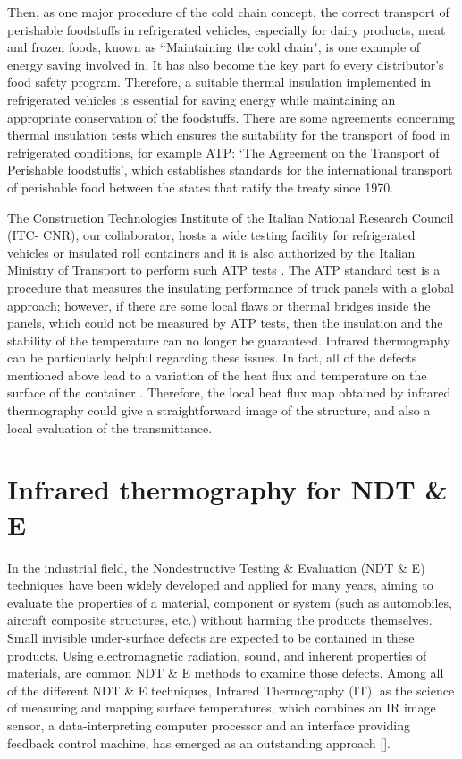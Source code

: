 Then, as one major procedure of the cold chain concept, the correct transport of perishable foodstuffs in refrigerated vehicles, especially for dairy products, meat and frozen foods, known as ``Maintaining the cold chain", is one example of energy saving involved in. It has also become the key part fo every distributor's food safety program. Therefore, a suitable thermal insulation implemented in refrigerated vehicles is essential for saving energy while maintaining an appropriate conservation of the foodstuffs. There are some agreements concerning thermal insulation tests which ensures the suitability for the transport of food in refrigerated conditions, for example ATP: ‘The Agreement on the Transport of Perishable foodstuffs’\citep{Geneva1970}, which establishes standards for the international transport of perishable food between the states that ratify the treaty since 1970.

The Construction Technologies Institute of the Italian National Research Council (ITC- CNR), our collaborator, hosts a wide testing facility for refrigerated vehicles or insulated roll containers and it is also authorized by the Italian Ministry of Transport to perform such ATP tests \citep{Tassou2009,dragano2009experimental}. The ATP standard test is a procedure that measures the insulating performance of truck panels with a global approach; however, if there are some local flaws or thermal bridges inside the panels, which could not be measured by ATP tests, then the insulation and the stability of the temperature can no longer be guaranteed. Infrared thermography can be particularly helpful regarding these issues. In fact, all of the defects mentioned above lead to a variation of the heat flux and temperature on the surface of the container \citep{grinzato2010r, grinzatoquality, grinzato1comparison}. Therefore, the local heat flux map obtained by infrared thermography could give a straightforward image of the structure, and also a local evaluation of the transmittance.

\section{Infrared thermography for NDT \& E}
In the industrial field, the Nondestructive Testing \& Evaluation (NDT \& E) techniques have been  widely developed and applied for many years, aiming to evaluate the properties of a material, component or system (such as automobiles, aircraft composite structures, etc.) without harming the products themselves. Small invisible under-surface defects are expected to be contained in these products. Using electromagnetic radiation, sound, and inherent properties of materials, are common NDT \& E methods to examine those defects. Among all of the different NDT \& E techniques, Infrared Thermography (IT), as the science of measuring and mapping surface temperatures, which combines an IR image sensor, a data-interpreting computer processor and an interface providing feedback control machine, has emerged as an  outstanding approach [\citep{maldague3introduction,cielo1987thermographie,Maldague2001theory,stanley1994non,pradere2009microscale,avdelidis2004applications}].

